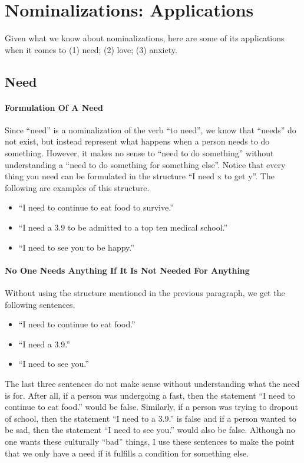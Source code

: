 \documentclass[a4paper, 12pt]{article}
\begin{document}
\section{Nominalizations: Applications}
Given what we know about nominalizations, here are some of its applications when it comes to (1) need; (2) love; (3) anxiety. \\
\subsection{Need}
\paragraph{Formulation Of A Need}
Since ``need'' is a nominalization of the verb ``to need'', we know that ``needs'' do not exist, but instead represent what happens when a person needs to do something. However, it makes no sense to ``need to do something'' without understanding a ``need to do something for something else''. Notice that every thing you need can be formulated in the structure ``I need x to get y''. The following are examples of this structure.
\begin{itemize}
  \item ``I need to continue to eat food to survive.''
  \item ``I need a 3.9 to be admitted to a top ten medical school.''
  \item ``I need to see you to be happy.''
\end{itemize}
\paragraph{No One Needs Anything If It Is Not Needed For Anything}
Without using the structure mentioned in the previous paragraph, we get the following sentences.
\begin{itemize}
  \item ``I need to continue to eat food.''
  \item ``I need a 3.9.''
  \item ``I need to see you.''
\end{itemize}
The last three sentences do not make sense without understanding what the need is for. After all, if a person was undergoing a fast, then the statement ``I need to continue to eat food.'' would be false. Similarly, if a person was trying to dropout of school, then the statement ``I need to a 3.9.'' is false and if a person wanted to be sad, then the statement ``I need to see you.'' would also be false. Although no one wants these culturally ``bad'' things, I use these sentences to make the point that we only have a need if it fulfills a condition for something else. \\
\end{document}
